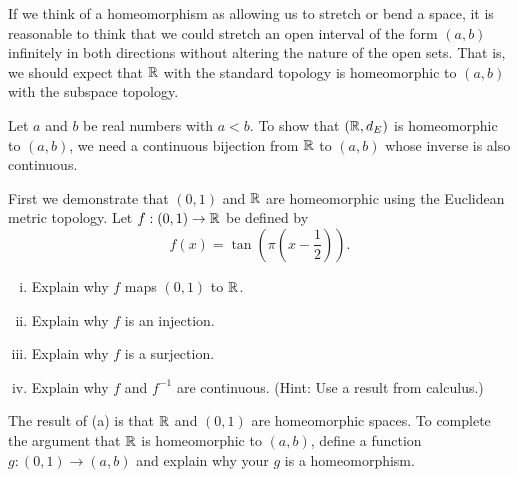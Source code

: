 \label{sec_open_int_rn}

If we think of a homeomorphism as allowing us to stretch or bend a space, it is reasonable to think that we could stretch an open interval of the form $(a,b)$ infinitely in both directions without altering the nature of the open sets. That is, we should expect that $\mathbb{R}$ with the standard topology is homeomorphic to $(a,b)$ with the subspace topology.   

\begin{activity} Let $a$ and $b$ be real numbers with $a < b$. To show that $(\mathbb{R}, d_E)$ is homeomorphic to $(a,b)$, we need a continuous bijection from $\mathbb{R}$ to $(a,b)$ whose inverse is also continuous. 
\ba
\item First we demonstrate that $(0,1)$ and $\mathbb{R}$ are homeomorphic using the Euclidean metric topology. Let $f : (0,1) \to \mathbb{R}$ be defined by 
\[f(x) = \tan\left(\pi\left(x-\frac{1}{2}\right)\right).\]
	\begin{enumerate}[i.]
	\item Explain why $f$ maps $(0,1)$ to $\mathbb{R}$.
	
	\item Explain why $f$ is an injection.
	
	\item Explain why $f$ is a surjection.
	
	\item Explain why $f$ and $f^{-1}$ are continuous. (Hint: Use a result from calculus.) 
	
	\end{enumerate}

\item The result of (a) is that $\mathbb{R}$ and $(0,1)$ are homeomorphic spaces. To complete the argument that $\mathbb{R}$ is homeomorphic to $(a,b)$, define a function $g: (0,1) \to (a,b)$ and explain why your $g$ is a homeomorphism.

\ea

\end{activity}

